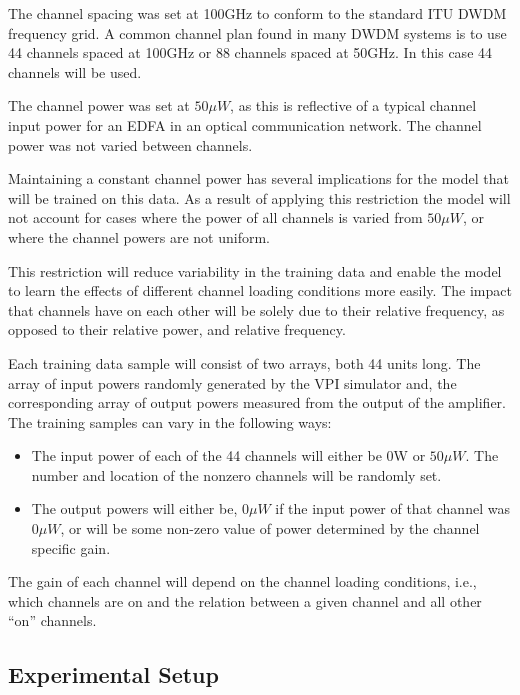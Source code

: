 The channel spacing was set at 100GHz to conform to the standard ITU DWDM frequency grid. A common channel plan found in many DWDM systems is to use 44 channels spaced at 100GHz or 88 channels spaced at 50GHz. In this case 44 channels will be used.  

The channel power was set at $50\mu W$, as this is reflective of a typical channel input power for an EDFA in an optical communication network. The channel power was not varied between channels.

Maintaining a constant channel power has several implications for the model that will be trained on this data. As a result of applying this restriction the model will not account for cases where the power of all channels is varied from $50\mu W$, or where the channel powers are not uniform. 

This restriction will reduce variability in the training data and enable the model to learn the effects of different channel loading conditions more easily. The impact that channels have on each other will be solely due to their relative frequency, as opposed to their relative power, and relative frequency.


Each training data sample will consist of two arrays, both 44 units long. The array of input powers randomly generated by the VPI simulator and, the corresponding array of output powers measured from the output of the amplifier. The training samples can vary in the following ways:
\begin{itemize}
    \item The input power of each of the 44 channels will either be 0W or $50\mu W$. The number and location of the nonzero channels will be randomly set.
    
    \item The output powers will either be, $0\mu W$ if the input power of that channel was $0\mu W$, or will be some non-zero value of power determined by the channel specific gain.
\end{itemize}

The gain of each channel will depend on the channel loading conditions, i.e., which channels are on and the relation between a given channel and all other “on” channels.




\subsection{Experimental Setup}
\FloatBarrier

